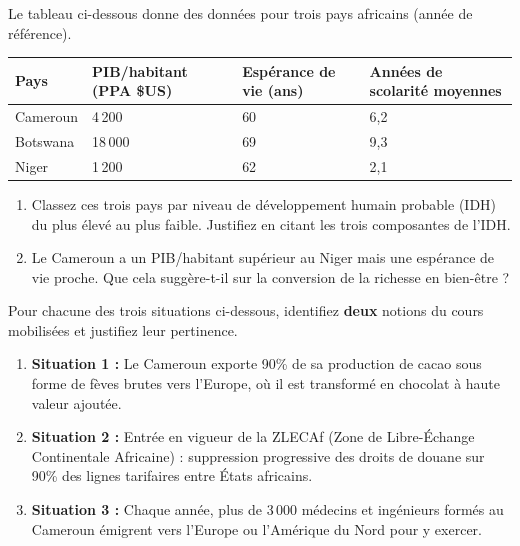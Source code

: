 \documentclass[11pt]{article}
\newcounter{popsec}
\newcounter{popsub}
\newcommand{\courssub}[1]{%
  \stepcounter{popsub}%
  \par\vspace{9pt}\noindent{\popxbold\fontsize{11.5}{13}\selectfont\color{popink}{\color{poporange}\thepopsec.\thepopsub}\hspace{6pt}#1}\par\nopagebreak\vspace{4pt}
}
\begin{document}
\begin{exercice}
Le tableau ci-dessous donne des données pour trois pays africains (année de référence).

\begin{center}
\begin{tabularx}{\linewidth}{|l|X|X|X|}\hline
Pays & PIB/habitant (PPA \$US) & Espérance de vie (ans) & Années de scolarité moyennes \\ \hline
Cameroun & 4\,200 & 60 & 6,2 \\
Botswana & 18\,000 & 69 & 9,3 \\
Niger & 1\,200 & 62 & 2,1 \\ \hline
\end{tabularx}
\end{center}

\begin{enumerate}
\item Classez ces trois pays par niveau de développement humain probable (IDH) du plus élevé au plus faible. Justifiez en citant les trois composantes de l'IDH.
\item Le Cameroun a un PIB/habitant supérieur au Niger mais une espérance de vie proche. Que cela suggère-t-il sur la conversion de la richesse en bien-être ?
\end{enumerate}
\end{exercice}

\courssub{Je m'entraîne}

\begin{exercice}
Pour chacune des trois situations ci-dessous, identifiez \textbf{deux} notions du cours mobilisées et justifiez leur pertinence.

\begin{enumerate}
\item \textbf{Situation 1 :} Le Cameroun exporte 90\% de sa production de cacao sous forme de fèves brutes vers l'Europe, où il est transformé en chocolat à haute valeur ajoutée.
\item \textbf{Situation 2 :} Entrée en vigueur de la ZLECAf (Zone de Libre-Échange Continentale Africaine) : suppression progressive des droits de douane sur 90\% des lignes tarifaires entre États africains.
\item \textbf{Situation 3 :} Chaque année, plus de 3\,000 médecins et ingénieurs formés au Cameroun émigrent vers l'Europe ou l'Amérique du Nord pour y exercer.
\end{enumerate}
\end{exercice}
\end{document}
